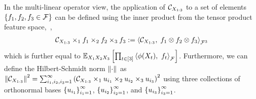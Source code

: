\documentclass{article}
\begin{document}
In the multi-linear operator view, 
the application of $\mathcal{C}_{X_{1:3}}$ to a set of elements $\left\{f_1,f_2,f_3 \in \mathcal{F}\right\}$ can be defined using the inner product from the tensor product feature space,~\ie,
\begin{align*}
	\mathcal{C}_{X_{1:3}} \times_1 f_1 \times_2 f_2 \times_3 f_3
	:= \left\langle \mathcal{C}_{X_{1:3}},\;f_1\otimes f_2\otimes f_3 \right\rangle_{\mathcal{F}^3}
\end{align*}
which is further equal to $\mathbb{E}_{X_1X_2X_3}\left[\prod_{t \in [3]} \left\langle \phi(X_t),~f_t \right\rangle_{\mathcal{F}}\right]$.
Furthermore, we can define the Hilbert-Schmidt norm $\left\|\cdot\right\|_{}$ as
$
 \left\|\mathcal{C}_{X_{1:3}}\right\|_{}^2 = \sum_{i_1,i_2,i_3 = 1}^\infty \left(\mathcal{C}_{X_{1:3}} \times_1 u_{i_1} \times_2 u_{i_2} \times_3 u_{i_3}\right)^2
$
using three collections of orthonormal bases $\left\{u_{i_1}\right\}_{i_1=1}^\infty$, $\left\{u_{i_2}\right\}_{i_2=1}^\infty$, and $\left\{u_{i_3}\right\}_{i_3=1}^\infty$. 
\end{document}
